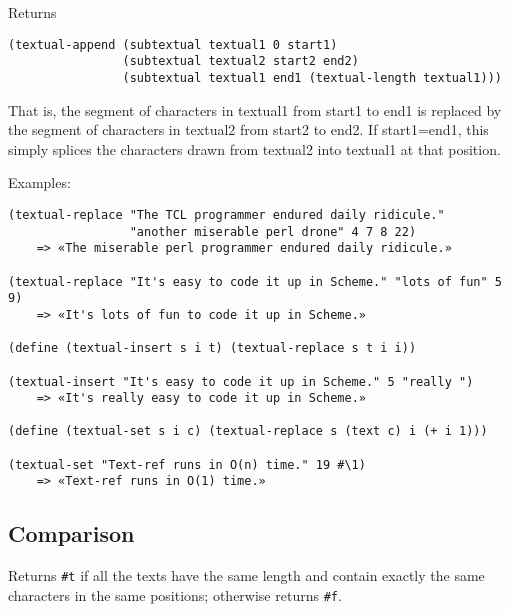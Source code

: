 \begin{entry}{%
  }
  Returns

\begin{verbatim}
(textual-append (subtextual textual1 0 start1)
                (subtextual textual2 start2 end2)
                (subtextual textual1 end1 (textual-length textual1)))
\end{verbatim}

  That is, the segment of characters in textual1 from start1 to end1
  is replaced by the segment of characters in textual2 from start2 to
  end2.  If start1=end1, this simply splices the characters drawn from
  textual2 into textual1 at that position.

  Examples:

\begin{verbatim}
(textual-replace "The TCL programmer endured daily ridicule."
                 "another miserable perl drone" 4 7 8 22)
    => «The miserable perl programmer endured daily ridicule.»

(textual-replace "It's easy to code it up in Scheme." "lots of fun" 5 9)
    => «It's lots of fun to code it up in Scheme.»

(define (textual-insert s i t) (textual-replace s t i i))

(textual-insert "It's easy to code it up in Scheme." 5 "really ")
    => «It's really easy to code it up in Scheme.»

(define (textual-set s i c) (textual-replace s (text c) i (+ i 1)))

(textual-set "Text-ref runs in O(n) time." 19 #\1)
    => «Text-ref runs in O(1) time.»
\end{verbatim}
\end{entry}

\subsection{{Comparison}}\label{comparison}


\begin{entry}{%
  }

  Returns \texttt{\#t} if all the texts have the same length
  and contain exactly the same characters in the same positions;
  otherwise returns \texttt{\#f}.
\end{entry}

